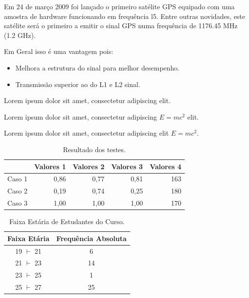 \newpage Em \cite{Barbosa2004} 24 de março 2009 foi lançado o primeiro satélite GPS equipado com uma amostra de hardware funcionando em frequência l5.
\cite{Barbosa2004} Entre outras novidades, este satélite será o primeiro a emitir o sinal GPS numa frequência de 1176.45 MHz (1.2 GHz).

Em Geral isso é uma vantagem pois:
\begin{itemize}
    \item Melhora a estrutura do sinal para melhor desempenho.
    \item Transmissão superior ao do L1 e L2 sinal.
\end{itemize}
\begin{center}
Lorem ipsum dolor sit amet, consectetur adipiscing elit.
\end{center}

\begin{flushleft}
Lorem ipsum dolor sit amet, consectetur adipiscing $E=mc^2$ elit.
\end{flushleft}

\begin{flushright}
Lorem ipsum dolor sit amet, consectetur adipiscing elit \(E=mc^2\).
\end{flushright}

\begin{table}[!htb]
    \centering
    \caption[Resultado dos testes]{Resultado dos testes.
    \label{tab:tabela-exemplo1}}
    \begin{tabular}{rrrrr}
        \toprule
            & Valores 1 & Valores 2 & Valores 3 & Valores 4 \\
        \midrule
            Caso 1 & 0,86 & 0,77 & 0,81 & 163 \\
            Caso 2 & 0,19 & 0,74 & 0,25 & 180 \\
            Caso 3 & 1,00 & 1,00 & 1,00 & 170 \\
        \bottomrule
    \end{tabular}
\end{table}

\begin{table}[!htb]
    \centering
    \caption[Faixa Estária de Estudantes do Curso.]{Faixa Estária de Estudantes do Curso.
    \label{tab:tabela-exemplo1}}
    \begin{tabular}{cc}
        \toprule
            Faixa Etária & Frequência Absoluta \\
        \midrule
            19 $\vdash$ 21 & 6 \\
            21 $\vdash$ 23 & 14 \\
            23 $\vdash$ 25 & 1 \\
            25 $\vdash$ 27 & 25 \\
        \bottomrule
    \end{tabular}
\end{table}

